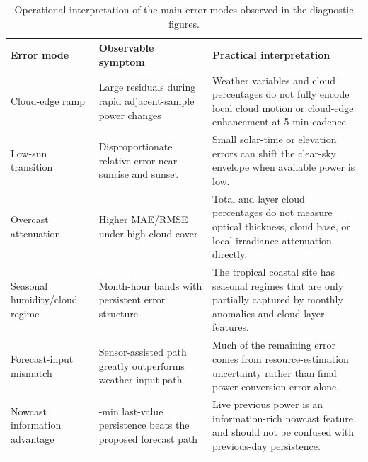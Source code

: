 \begin{table}[!t]
\caption{Operational interpretation of the main error modes observed in the diagnostic figures.}
\label{tab:error_taxonomy}
\centering
\small
\begin{tabularx}{\textwidth}{@{}l>{\raggedright\arraybackslash}X>{\raggedright\arraybackslash}X@{}}
\toprule
Error mode & Observable symptom & Practical interpretation \\
\midrule
Cloud-edge ramp & Large residuals during rapid adjacent-sample power changes & Weather variables and cloud percentages do not fully encode local cloud motion or cloud-edge enhancement at 5-min cadence. \\
Low-sun transition & Disproportionate relative error near sunrise and sunset & Small solar-time or elevation errors can shift the clear-sky envelope when available power is low. \\
Overcast attenuation & Higher MAE/RMSE under high cloud cover & Total and layer cloud percentages do not measure optical thickness, cloud base, or local irradiance attenuation directly. \\
Seasonal humidity/cloud regime & Month-hour bands with persistent error structure & The tropical coastal site has seasonal regimes that are only partially captured by monthly anomalies and cloud-layer features. \\
Forecast-input mismatch & Sensor-assisted path greatly outperforms weather-input path & Much of the remaining error comes from resource-estimation uncertainty rather than final power-conversion error alone. \\
Nowcast information advantage & 5-min last-value persistence beats the proposed forecast path & Live previous power is an information-rich nowcast feature and should not be confused with previous-day persistence. \\
\bottomrule
\end{tabularx}
\end{table}
